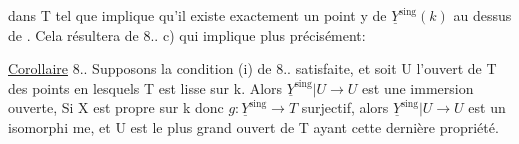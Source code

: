 
dans T tel que \hand{$\xi$}   implique qu'il existe exactement  un point  y de
$\underline{Y}^{\text{sing}}(k)$ au dessus de \hand{$\xi$}. Cela résultera de 8.. c) qui implique plus
 précisément:

\uline{Corollaire} 8..  Supposons la condition (i) de 8.. satisfaite, et
soit  
U l'ouvert de T des points en lesquels T est lisse sur k. Alors 
$\underline{Y}^{\text{sing}}|U \longrightarrow U$ est une immersion ouverte,  
 Si X est propre sur
k donc $g:\underline{Y}^{\text{sing}}\longrightarrow T$ surjectif, alors $\underline{Y}^{\text{sing}}|U\longrightarrow U$ est un isomorphi
me, et U est le plus grand ouvert de T ayant cette dernière propriété.

